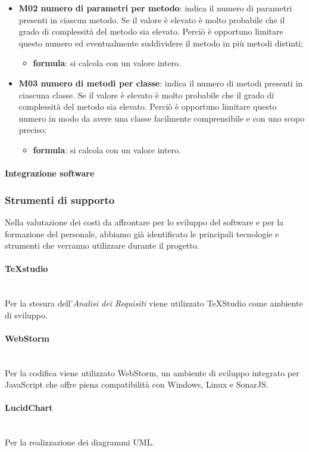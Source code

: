 		\begin{itemize}
			\item \textbf{M02 numero di parametri per metodo}: indica il numero di parametri presenti in ciascun metodo. Se il valore è elevato è molto probabile che il grado di complessità del metodo sia elevato. Perciò è opportuno limitare questo numero ed eventualmente suddividere il metodo in più metodi distinti;
			\begin{itemize}
				\item[] \textbf{formula}: si calcola con un valore intero.
			\end{itemize}
			\item \textbf{M03 numero di metodi per classe}: indica il numero di metodi presenti in ciascuna classe. Se il valore è elevato è molto probabile che il grado di complessità del metodo sia elevato. Perciò è opportuno limitare questo numero in modo da avere una classe facilmente comprensibile e con uno scopo preciso;
			\begin{itemize}
				\item[] \textbf{formula}: si calcola con un valore intero.
			\end{itemize}
		\end{itemize}
		\paragraph{Integrazione software}
		\subsubsection{Strumenti di supporto}
		Nella valutazione dei costi da affrontare per lo sviluppo del software e per la formazione del personale, abbiamo già identificato le principali tecnologie e strumenti che verranno utilizzare durante il progetto\glo.
		\paragraph{TeXstudio}\mbox{}\\ [1mm]
		Per la stesura dell'\textit{Analisi dei Requisiti} viene utilizzato TeXStudio come ambiente di sviluppo.
		\paragraph{WebStorm}\mbox{}\\ [1mm]
		Per la codifica viene utilizzato WebStorm, un ambiente di sviluppo integrato per JavaScript che offre piena compatibilità con Windows, Linux e SonarJS\glo.
		\paragraph{LucidChart}\mbox{}\\ [1mm]
		Per la realizzazione dei diagrammi UML\glo.	
